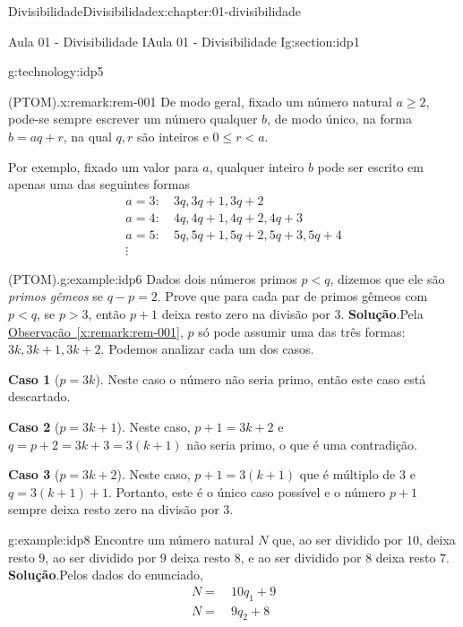 \documentclass[oneside,10pt,]{book}
\newcommand{\blocktitlefont}{\relax}
\newcommand{\xreffont}{\relax}
\newcommand{\terminology}[1]{\textbf{#1}}
\numberwithin{equation}{section}
\newcommand{\lt}{<}
\newcommand{\amp}{&}
\begin{document}
\begin{chapterptx}{Divisibilidade}{}{Divisibilidade}{}{}{x:chapter:01-divisibilidade}
\begin{sectionptx}{Aula 01 - Divisibilidade I}{}{Aula 01 - Divisibilidade I}{}{}{g:section:idp1}
\begin{technology}{}{g:technology:idp5}
\begin{sageoutput}
\end{sageoutput}
\end{technology}
\begin{remark}{(PTOM).}{x:remark:rem-001}%
De modo geral, fixado um número natural \(a\geq 2\), pode-se sempre escrever um número qualquer \(b\), de modo único, na forma \(b = aq+r\), na qual \(q, r\) são inteiros e \(0\leq r \lt a\).%
\par
Por exemplo, fixado um valor para \(a\),  qualquer inteiro \(b\) pode ser escrito em apenas uma das seguintes formas%
\begin{align*}
a=3:\amp~ 3q, 3q+1, 3q+2\\
a=4:\amp~ 4q, 4q+1, 4q+2, 4q+3\\
a=5:\amp~ 5q, 5q+1, 5q+2, 5q+3, 5q+4\\
\vdots 
\end{align*}
%
\end{remark}
\begin{example}{(PTOM).}{g:example:idp6}%
Dados dois números primos \(p\lt q\), dizemos que ele são \emph{primos gêmeos} se \(q-p=2\). Prove que para cada par de primos gêmeos com \(p\lt q\), se \(p>3\), então \(p+1\) deixa resto zero na divisão por \(3\).%
\textbf{\blocktitlefont Solução}.\hypertarget{g:solution:idp7}{}\quad{}Pela \hyperref[x:remark:rem-001]{Observação~{\xreffont\ref{x:remark:rem-001}}}, \(p\) só pode assumir uma das três formas: \(3k, 3k+1, 3k+2\). Podemos analizar cada um dos casos.%
\par
\terminology{Caso 1} (\(p=3k\)). Neste caso o número não seria primo, então este caso está descartado.%
\par
\terminology{Caso 2} (\(p=3k+1\)). Neste caso, \(p+1 = 3k+2\) e \(q = p+2 = 3k+3=3(k+1)\) não seria primo, o que é uma contradição.%
\par
\terminology{Caso 3} (\(p=3k+2\)). Neste caso, \(p+1 = 3(k+1)\) que é múltiplo de \(3\) e \(q = 3(k+1)+1\). Portanto, este é o único caso possível e o número \(p+1\) sempre deixa resto zero na divisão por \(3\).%
\end{example}
\begin{example}{}{g:example:idp8}%
Encontre um número natural \(N\) que, ao ser dividido por \(10\), deixa resto \(9\), ao ser dividido por \(9\) deixa resto \(8\), e ao ser dividido por \(8\) deixa resto \(7\).%
\textbf{\blocktitlefont Solução}.\hypertarget{g:solution:idp9}{}\quad{}Pelos dados do enunciado,%
\begin{align*}
N = \amp~10q_1+9\\
N = \amp~9q_2+8\\

\end{align*}
\end{example}
\end{sectionptx}
\end{chapterptx}
\end{document}
